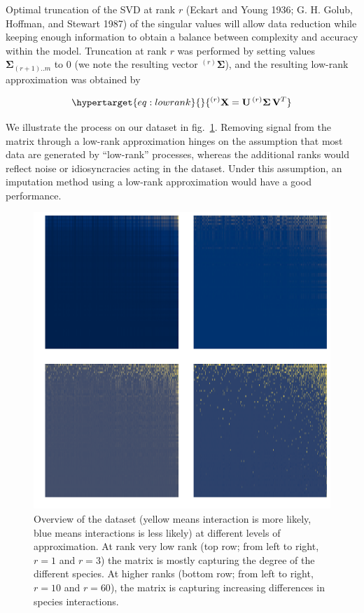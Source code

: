 \documentclass[11pt]{article}
\makeatletter
\def\maxwidth{\ifdim\Gin@nat@width>\linewidth\linewidth
\else\Gin@nat@width\fi}
\let\Oldincludegraphics\includegraphics
\renewcommand{\includegraphics}[1]{\Oldincludegraphics[width=\maxwidth]{#1}}
\makeatother
\begin{document}
Optimal truncation of the SVD at rank \(r\) (Eckart and Young 1936; G.
H. Golub, Hoffman, and Stewart 1987) of the singular values will allow
data reduction while keeping enough information to obtain a balance
between complexity and accuracy within the model. Truncation at rank
\(r\) was performed by setting values \(\mathbf{\Sigma}_{(r+1)..m}\) to
0 (we note the resulting vector \(^{(r)}\mathbf{\Sigma}\)), and the
resulting low-rank approximation was obtained by

\begin{equation}\protect\hypertarget{eq:lowrank}{}{^{(r)}\mathbf{X} =  \mathbf{U} \, ^{(r)}\mathbf{\Sigma \, V}^T}\label{eq:lowrank}\end{equation}

We illustrate the process on our dataset in fig.~\ref{fig:lowrank}.
Removing signal from the matrix through a low-rank approximation hinges
on the assumption that most data are generated by ``low-rank''
processes, whereas the additional ranks would reflect noise or
idiosyncracies acting in the dataset. Under this assumption, an
imputation method using a low-rank approximation would have a good
performance.

\begin{figure}
\hypertarget{fig:lowrank}{%
\centering
\includegraphics{figures/lowrank_illustration.png}
\caption{Overview of the dataset (yellow means interaction is more
likely, blue means interactions is less likely) at different levels of
approximation. At rank very low rank (top row; from left to right,
\(r=1\) and \(r=3\)) the matrix is mostly capturing the degree of the
different species. At higher ranks (bottom row; from left to right,
\(r=10\) and \(r=60\)), the matrix is capturing increasing differences
in species interactions.}\label{fig:lowrank}
}
\end{figure}
\end{document}
